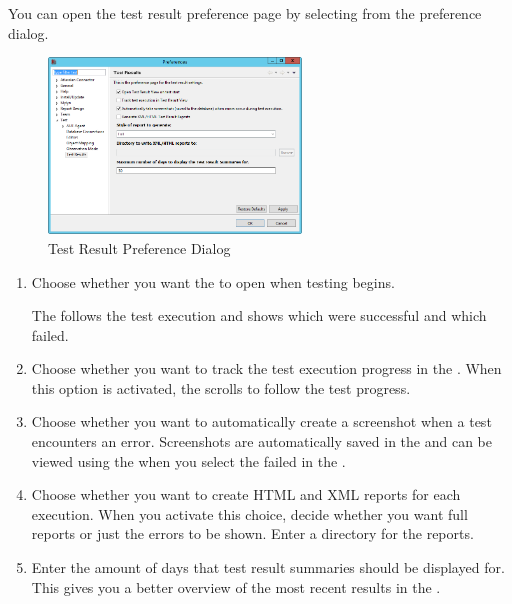 
You can open the test result preference page by selecting  from the preference dialog. 

\begin{figure}[h]
\begin{center}
\includegraphics[width=0.6\textwidth]{Tasks/Preferences/PS/testresultprefs}
\caption{Test Result Preference Dialog}
\label{testresultprefs}
\end{center}
\end{figure}
\begin{enumerate}
\item Choose whether you want the  \gdtestresultview{} to open when testing begins. 

The \gdtestresultview{} follows the test execution and shows which \gdsteps{} were successful and which failed. 

\item Choose whether you want to track the test execution progress in the \gdtestresultview{}. When this option is activated, the \gdtestresultview{} scrolls to follow the test progress. 
\item Choose whether you want to automatically create a screenshot when a test encounters an error. Screenshots are automatically saved in the \gddb{} and can be viewed using the \gdimgview{} when you select the failed \gdstep{} in the \gdtestresultview{}. 
\item Choose whether you want to create HTML and XML reports for each execution. When you activate this choice, decide whether you want full reports or just the errors to be shown. Enter a directory for the reports. 
\item Enter the amount of days that test result summaries should be displayed for. This gives you a better overview of the most recent results in the \gdtestsummaryview{}. 
\end{enumerate}


